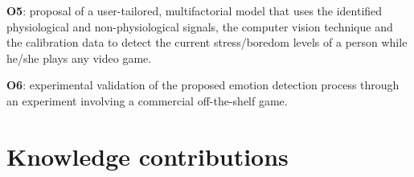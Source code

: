 \textbf{O5}: proposal of a user-tailored, multifactorial model that uses the identified physiological and non-physiological signals, the computer vision technique and the calibration data to detect the current stress/boredom levels of a person while he/she plays any video game.

\textbf{O6}: experimental validation of the proposed emotion detection process through an experiment involving a commercial off-the-shelf game.




\section{Knowledge contributions}
\label{sec:contributions}

